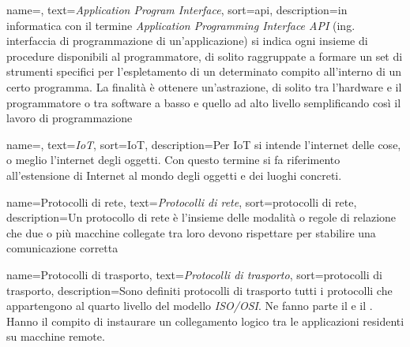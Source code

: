  {
    name=,
    text=\emph{Application Program Interface},
    sort=api,
    description={in informatica con il termine \emph{Application Programming Interface API} (ing. interfaccia di programmazione di un'applicazione) si indica ogni insieme di procedure disponibili al programmatore, di solito raggruppate a formare un set di strumenti specifici per l'espletamento di un determinato compito all'interno di un certo programma. La finalità è ottenere un'astrazione, di solito tra l'hardware e il programmatore o tra software a basso e quello ad alto livello semplificando così il lavoro di programmazione}
}

 {
    name=,
    text=\emph{IoT},
    sort=IoT,
    description={Per IoT si intende l'internet delle cose, o meglio l'internet degli oggetti. Con questo termine si fa riferimento all'estensione di Internet al mondo degli oggetti e dei luoghi concreti. }
}

 {
    name=Protocolli di rete,
    text=\emph{Protocolli di rete},
    sort=protocolli di rete,
    description={Un protocollo di rete è l'insieme delle modalità o regole di relazione che due o più macchine collegate tra loro devono rispettare per stabilire una comunicazione corretta}
}

 {
    name=Protocolli di trasporto,
    text=\emph{Protocolli di trasporto},
    sort=protocolli di trasporto,
    description={Sono definiti protocolli di trasporto tutti i protocolli che appartengono al quarto livello del modello \emph{\gls{ISO/OSI}}. Ne fanno parte il  e il . Hanno il compito di instaurare un collegamento logico tra le applicazioni residenti su macchine remote. }
}

